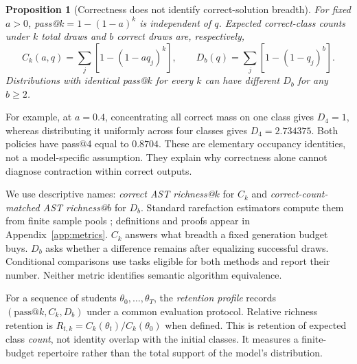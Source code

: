\documentclass{article}
\newtheorem{proposition}{Proposition}
\begin{document}
\begin{proposition}[Correctness does not identify correct-solution breadth]
\label{prop:breadth}
For fixed $a>0$, pass@$k=1-(1-a)^k$ is independent of $q$. Expected correct-class counts under $k$ total draws and $b$ correct draws are, respectively,
\begin{equation}
C_k(a,q)=\sum_j[1-(1-aq_j)^k],\qquad
D_b(q)=\sum_j[1-(1-q_j)^b].
\label{eq:occupancy}
\end{equation}
Distributions with identical pass@$k$ for every $k$ can have different $D_b$ for any $b\ge2$.
\end{proposition}
For example, at $a=0.4$, concentrating all correct mass on one class gives $D_4=1$, whereas distributing it uniformly across four classes gives $D_4=2.734375$. Both policies have pass@4 equal to $0.8704$. These are elementary occupancy identities, not a model-specific assumption. They explain why correctness alone cannot diagnose contraction within correct outputs.

We use descriptive names: \emph{correct AST richness@$k$} for $C_k$ and \emph{correct-count-matched AST richness@$b$} for $D_b$. Standard rarefaction estimators compute them from finite sample pools \citep{hurlbert1971nonconcept}; definitions and proofs appear in Appendix~\ref{app:metrics}. $C_k$ answers what breadth a fixed generation budget buys. $D_b$ asks whether a difference remains after equalizing successful draws. Conditional comparisons use tasks eligible for both methods and report their number. Neither metric identifies semantic algorithm equivalence.

For a sequence of students $\theta_0,\ldots,\theta_T$, the \emph{retention profile} records $(\mathrm{pass@}k,C_k,D_b)$ under a common evaluation protocol. Relative richness retention is $R_{t,k}=C_k(\theta_t)/C_k(\theta_0)$ when defined. This is retention of expected class \emph{count}, not identity overlap with the initial classes. It measures a finite-budget repertoire rather than the total support of the model's distribution.
\end{document}
